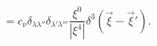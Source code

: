 \begin{equation}
[a_{\lambda\lambda'}(\xi,\nu),a_{\lambda''\lambda'''}^{\dag}(\xi',\nu)]=
c_{\nu}\delta_{\lambda\lambda''}\delta_{\lambda'\lambda'''}\frac{\xi^0}{|\xi^4|}\delta^3(\vec\xi-\vec\xi').
\end{equation}

